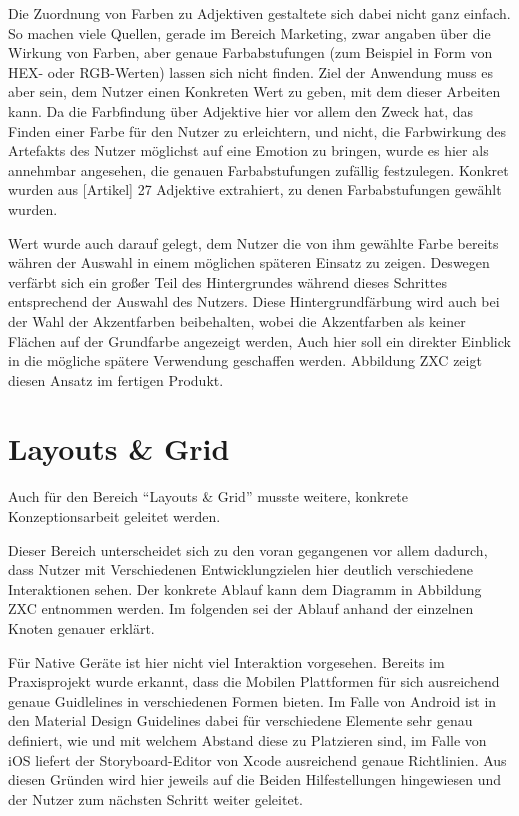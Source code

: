 Die Zuordnung von Farben zu Adjektiven gestaltete sich dabei nicht ganz einfach. So machen viele Quellen, gerade im Bereich Marketing, zwar angaben über die Wirkung von Farben, aber genaue Farbabstufungen (zum Beispiel in Form von HEX- oder RGB-Werten) lassen sich nicht finden.
Ziel der Anwendung muss es aber sein, dem Nutzer einen Konkreten Wert zu geben, mit dem dieser Arbeiten kann. Da die Farbfindung über Adjektive hier vor allem den Zweck hat, das Finden einer Farbe für den Nutzer zu erleichtern, und nicht, die Farbwirkung des Artefakts des Nutzer möglichst auf eine Emotion zu bringen, wurde es hier als annehmbar angesehen, die genauen Farbabstufungen zufällig festzulegen. Konkret wurden aus [Artikel] 27 Adjektive extrahiert, zu denen Farbabstufungen gewählt wurden.

Wert wurde auch darauf gelegt, dem Nutzer die von ihm gewählte Farbe bereits währen der Auswahl in einem möglichen späteren Einsatz zu zeigen. Deswegen verfärbt sich ein großer Teil des Hintergrundes während dieses Schrittes entsprechend der Auswahl des Nutzers. Diese Hintergrundfärbung wird auch bei der Wahl der Akzentfarben beibehalten, wobei die Akzentfarben als keiner Flächen auf der Grundfarbe angezeigt werden, Auch hier soll ein direkter Einblick in die mögliche spätere Verwendung geschaffen werden. Abbildung ZXC zeigt diesen Ansatz im fertigen Produkt.

\section{Layouts \& Grid}

Auch für den Bereich “Layouts \& Grid” musste weitere, konkrete Konzeptionsarbeit geleitet werden.

Dieser Bereich unterscheidet sich zu den voran gegangenen vor allem dadurch, dass Nutzer mit Verschiedenen Entwicklungzielen hier deutlich verschiedene Interaktionen sehen. Der konkrete Ablauf kann dem Diagramm in Abbildung ZXC entnommen werden. Im folgenden sei der Ablauf anhand der einzelnen Knoten genauer erklärt.

Für Native Geräte ist hier nicht viel Interaktion vorgesehen. Bereits im Praxisprojekt wurde erkannt, dass die Mobilen Plattformen für sich ausreichend genaue Guidlelines in verschiedenen Formen bieten. Im Falle von Android ist in den Material Design Guidelines dabei für verschiedene Elemente sehr genau definiert, wie und mit welchem Abstand diese zu Platzieren sind, im Falle von iOS liefert der Storyboard-Editor von Xcode ausreichend genaue Richtlinien.
Aus diesen Gründen wird hier jeweils auf die Beiden Hilfestellungen hingewiesen und der Nutzer zum nächsten Schritt weiter geleitet.

